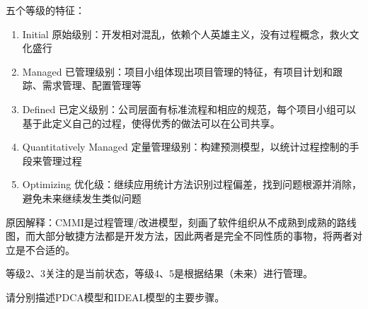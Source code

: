 \begin{solution}
五个等级的特征：
\begin{enumerate}[label=\arabic*.]
    \item Initial 原始级别：开发相对混乱，依赖个人英雄主义，没有过程概念，救火文化盛行
    \item Managed 已管理级别：项目小组体现出项目管理的特征，有项目计划和跟踪、需求管理、配置管理等
    \item Defined 已定义级别：公司层面有标准流程和相应的规范，每个项目小组可以基于此定义自己的过程，使得优秀的做法可以在公司共享。
    \item Quantitatively Managed 定量管理级别：构建预测模型，以统计过程控制的手段来管理过程
    \item Optimizing 优化级：继续应用统计方法识别过程偏差，找到问题根源并消除，避免未来继续发生类似问题
\end{enumerate}

原因解释：CMMI是过程管理/改进模型，刻画了软件组织从不成熟到成熟的路线图，而大部分敏捷方法都是开发方法，因此两者是完全不同性质的事物，将两者对立是不合适的。

等级2、3关注的是当前状态，等级4、5是根据结果（未来）进行管理。
\end{solution}



\begin{problem}[2015、2016]
请分别描述PDCA模型和IDEAL模型的主要步骤。
\end{problem}

